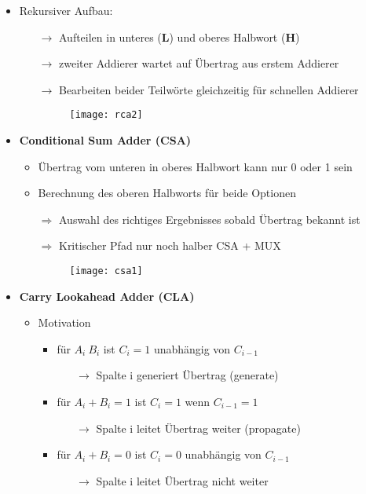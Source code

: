 \begin{itemize}
	\item Rekursiver Aufbau:
		\begin{itemize}
		\item[$\rightarrow$] Aufteilen in unteres (\textbf{L}) und oberes Halbwort (\textbf{H})
		\item[$\rightarrow$] zweiter Addierer wartet auf Übertrag aus erstem Addierer
		\item[$\rightarrow$] Bearbeiten beider Teilwörte gleichzeitig für schnellen Addierer
		\item[]
			\begin{figure}[H]
				\begin{center}
				\texttt{[image: rca2]}
				\end{center}
			\end{figure}
		\end{itemize}
		
\pagebreak		
		
\item \textbf{Conditional Sum Adder (CSA)}
	\begin{itemize}
	\item Übertrag vom unteren in oberes Halbwort kann nur 0 oder 1 sein
	\item Berechnung des oberen Halbworts für beide Optionen
	\item[$\Rightarrow$] Auswahl des richtiges Ergebnisses sobald Übertrag bekannt ist
	\item[$\Rightarrow$] Kritischer Pfad nur noch halber CSA + MUX
	\item[]
			\begin{figure}[H]
				\begin{center}
				\texttt{[image: csa1]}
				\end{center}
			\end{figure}
	\end{itemize}

\item \textbf{Carry Lookahead Adder (CLA)}
	\begin{itemize}
	\item Motivation	
		\begin{itemize}
		\item für $A_i~B_i$ ist $C_i = 1$ unabhängig von $C_{i-1}$
			\begin{itemize}
			\item[$\rightarrow$] Spalte i generiert Übertrag (generate)
			\end{itemize}
		\item für $A_i+B_i = 1$ ist $C_i = 1$ wenn $C_{i-1} = 1$
			\begin{itemize}
			\item[$\rightarrow$] Spalte  i leitet Übertrag weiter (propagate)
			\end{itemize}
		\item für $A_i + B_i = 0$ ist $C_i = 0$ unabhängig von $C_{i-1}$
			\begin{itemize}
			\item[$\rightarrow$] Spalte i leitet Übertrag nicht weiter
			\end{itemize}
		\end{itemize}
		

\end{itemize}
\end{itemize}
